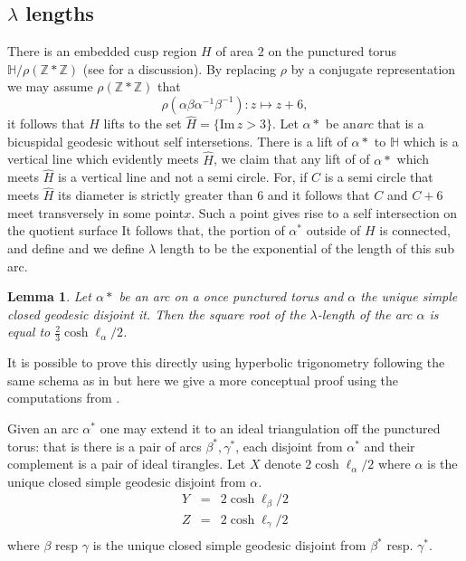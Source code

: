 \documentclass[12pt,a4paper]{amsart}
\newtheorem{lem}[thm]{Lemma}
\def\HH{\mathbb{H}}
\def\im{\mathrm{Im}\,}
\def\ZZ{\mathbb{Z}}
\begin{document}
\subsection{$\lambda$ lengths}

There is an embedded cusp region $H$ of area $2$ 
on the punctured torus $\HH/\rho(\ZZ*\ZZ)$
(see \cite{thesis} for a discussion).
By replacing $\rho$ by a conjugate representation
we may assume $\rho(\ZZ*\ZZ)$  that 
$$\rho(\alpha\beta\alpha^{-1}\beta^{-1}): z \mapsto z + 6,$$
it follows that $H$ lifts to the set $\hat{H} = \{ \im z > 3 \}$.
Let $\alpha*$ be an\textit{arc} that is a bicuspidal geodesic
without self intersetions.
There is a lift of $\alpha*$ to $\HH$ which is a vertical line
which evidently meets $\hat{H}$,
we claim that any lift of of $\alpha*$ 
which meets $\hat{H}$ is a vertical line and not a semi circle.
For, if $C$ is a semi circle that meets $\hat{H}$ 
its diameter is strictly greater than $6$ 
and it follows that $C$ and $C + 6$ meet transversely in some point$x$.
Such a point gives rise to a self intersection on the quotient surface
It follows that, the portion of $\alpha^*$ outside of $H$ is connected,
and define and we define  $\lambda$ length 
to be the exponential of the length of this sub arc.

\begin{lem}\label{lambda length}
Let $\alpha*$ be an arc on a once punctured torus 
and $\alpha$ the unique 
simple closed geodesic disjoint it.
Then the square root of the $\lambda$-length  of the arc $\alpha$
is equal to $\frac{2}{3}\cosh \ell_\alpha / 2$.
\end{lem}

It is possible to prove this directly using hyperbolic trigonometry 
following the same schema as in \cite{thesis}
but here we give a more conceptual proof  using the computations from \cite{saw}.

Given an arc $\alpha^*$ one may extend it to an ideal triangulation off the punctured torus:
that is there is a pair of arcs $\beta^*,\gamma^*$, each disjoint from  $\alpha^*$ and their complement 
is a pair of ideal tirangles. 
Let $X$ denote $2 \cosh \ell_\alpha / 2$ where $\alpha$ is the unique closed simple 
geodesic disjoint from $\alpha$.
\begin{eqnarray*}
Y &=& 2 \cosh \ell_\beta / 2 \\
Z  &=& 2 \cosh \ell_\gamma / 2 \\
\end{eqnarray*}
where $\beta$ resp $\gamma$ is the unique closed simple  geodesic disjoint from
$\beta^*$ resp. $\gamma^*$.
\end{document}
